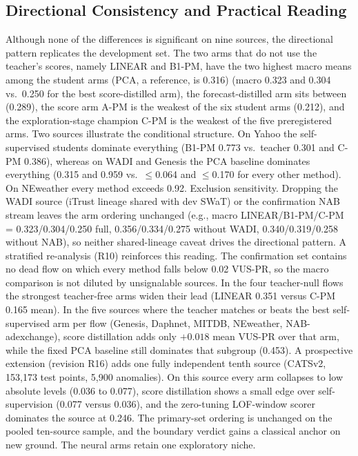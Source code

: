 \subsection{Directional Consistency and Practical Reading}\label{sec:confirm-reading}
Although none of the differences is significant on nine sources, the
directional pattern replicates the development set. The two arms that do
not use the teacher's scores, namely LINEAR and B1-PM, have the two highest macro means among the student arms (PCA, a reference, is 0.316)
(macro 0.323 and 0.304 vs.\ 0.250 for the best score-distilled arm), the
forecast-distilled arm sits between (0.289), the score arm A-PM is the
weakest of the six student arms (0.212), and the exploration-stage
champion C-PM is the weakest of the five preregistered arms.
Two sources illustrate the conditional structure. On Yahoo the
self-supervised students dominate everything (B1-PM 0.773 vs.\ teacher
0.301 and C-PM 0.386), whereas on WADI and Genesis the PCA baseline
dominates everything (0.315 and 0.959 vs.\ $\le$0.064 and $\le$0.170
for every other method).
On NEweather every method exceeds 0.92. Exclusion sensitivity. Dropping
the WADI source (iTrust lineage shared with dev SWaT) or the
confirmation NAB stream leaves the arm ordering unchanged (e.g., macro
LINEAR/B1-PM/C-PM = 0.323/0.304/0.250 full, 0.356/0.334/0.275 without
WADI, 0.340/0.319/0.258 without NAB), so neither shared-lineage caveat
drives the directional pattern.
A stratified re-analysis (R10) reinforces this reading.
The confirmation set contains no dead flow on which every method falls
below 0.02 VUS-PR, so the macro comparison is not diluted by
unsignalable sources.
In the four teacher-null flows the strongest teacher-free arms widen
their lead (LINEAR 0.351 versus C-PM 0.165 mean).
In the five sources where the teacher matches or beats the best
self-supervised arm per flow (Genesis, Daphnet, MITDB, NEweather,
NAB-adexchange), score distillation adds only $+0.018$ mean VUS-PR over
that arm, while the fixed PCA baseline still dominates that subgroup
(0.453).
A prospective extension (revision R16) adds one fully independent
tenth source (CATSv2, 153{,}173 test points, 5{,}900 anomalies).
On this source every arm collapses to low absolute levels (0.036 to
0.077), score distillation shows a small edge over self-supervision
(0.077 versus 0.036), and the zero-tuning LOF-window scorer dominates
the source at 0.246.
The primary-set ordering is unchanged on the pooled ten-source sample,
and the boundary verdict gains a classical anchor on new ground.
The neural arms retain one exploratory niche.

